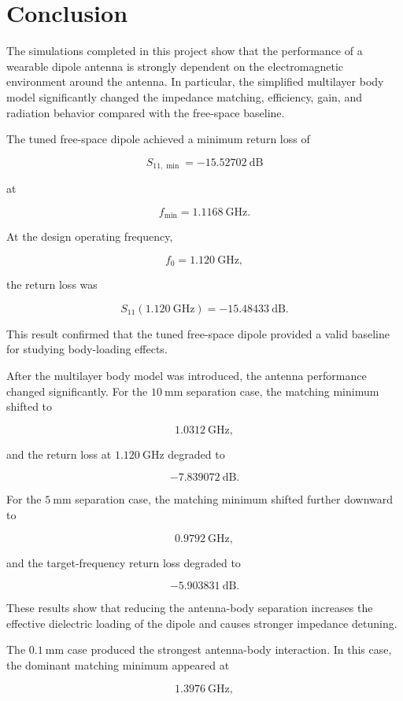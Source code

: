 \section{Conclusion}

The simulations completed in this project show that the performance of a wearable dipole antenna is strongly dependent on the electromagnetic environment around the antenna. In particular, the simplified multilayer body model significantly changed the impedance matching, efficiency, gain, and radiation behavior compared with the free-space baseline.

The tuned free-space dipole achieved a minimum return loss of

\[
S_{11,\min} = -15.52702~\mathrm{dB}
\]

at

\[
f_{\min} = 1.1168~\mathrm{GHz}.
\]

At the design operating frequency,

\[
f_0 = 1.120~\mathrm{GHz},
\]

the return loss was

\[
S_{11}(1.120~\mathrm{GHz}) = -15.48433~\mathrm{dB}.
\]

This result confirmed that the tuned free-space dipole provided a valid baseline for studying body-loading effects.

After the multilayer body model was introduced, the antenna performance changed significantly. For the \(10~\mathrm{mm}\) separation case, the matching minimum shifted to

\[
1.0312~\mathrm{GHz},
\]

and the return loss at \(1.120~\mathrm{GHz}\) degraded to

\[
-7.839072~\mathrm{dB}.
\]

For the \(5~\mathrm{mm}\) separation case, the matching minimum shifted further downward to

\[
0.9792~\mathrm{GHz},
\]

and the target-frequency return loss degraded to

\[
-5.903831~\mathrm{dB}.
\]

These results show that reducing the antenna-body separation increases the effective dielectric loading of the dipole and causes stronger impedance detuning.

The \(0.1~\mathrm{mm}\) case produced the strongest antenna-body interaction. In this case, the dominant matching minimum appeared at

\[
1.3976~\mathrm{GHz},
\]

